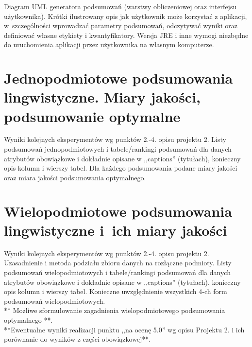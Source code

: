 \documentclass{classrep}
\begin{document}
\newpage
Diagram UML generatora podsumowań (warstwy obliczeniowej oraz interfejsu
użytkownika). Krótki ilustrowany opis jak użytkownik może korzystać z aplikacji, w~szczególności
wprowadzać parametry  podsumowań, odczytywać wyniki oraz definiować własne etykiety i
kwantyfikatory. Wersja JRE i inne wymogi niezbędne do uruchomienia aplikacji przez użytkownika na własnym komputerze. \\

\section{ Jednopodmiotowe podsumowania lingwistyczne. Miary jakości, podsumowanie optymalne}
Wyniki kolejnych eksperymentów wg punktów 2.-4. opisu projektu 2.  Listy podsumowań
jednopodmiotowych i tabele/rankingi podsumowań dla danych atrybutów obowiązkowe i dokładnie opisane w ,,captions'' (tytułach), konieczny opis kolumn i wierszy tabel. Dla każdego podsumowania podane miary jakości oraz miara jakości podsumowania
optymalnego.\\



\section{Wielopodmiotowe podsumowania lingwistyczne i~ich miary jakości} 
Wyniki kolejnych eksperymentów wg punktów 2.-4. opisu projektu 2. Uzasadnienie i
metoda podziału zbioru danych na rozłączne podmioty. Listy podsumowań
wielopodmiotowych i tabele/rankingi podsumowań dla danych atrybutów obowiązkowe i
dokładnie opisane w ,,captions'' (tytułach), konieczny opis kolumn i wierszy tabel.
Konieczne uwzględnienie wszystkich 4-ch form podsumowań wielopodmiotowych. 
\\ 

** Możliwe sformułowanie zagadnienia wielopodmiotowego podsumowania optymalnego **.\\

{**Ewentualne wyniki realizacji punktu ,,na ocenę 5.0'' wg opisu Projektu 2. i ich porównanie do wyników z
części obowiązkowej**.}\\

\end{document}
